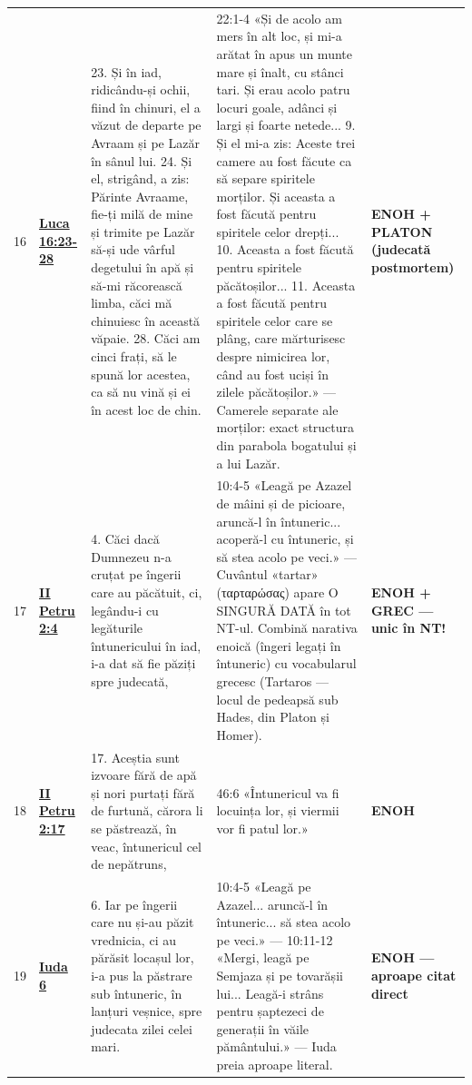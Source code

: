\documentclass[12pt,a4paper,twoside,openany]{book}
\begin{document}
\begin{longtable}{L{0.7cm}L{0.7cm}L{5.2cm}L{7.1cm}L{0.7cm}}
16 & \href{https://bibliaortodoxa.ro/carte.php?id=48\&cap=16\#23}{\textbf{Luca 16:23-28}} & 23. Și în iad, ridicându-și ochii, fiind în chinuri, el a văzut de departe pe Avraam și pe Lazăr în sânul lui. 24. Și el, strigând, a zis: Părinte Avraame, fie-ți milă de mine și trimite pe Lazăr să-și ude vârful degetului în apă și să-mi răcorească limba, căci mă chinuiesc în această văpaie. 28. Căci am cinci frați, să le spună lor acestea, ca să nu vină și ei în acest loc de chin. & 22:1-4 «Și de acolo am mers în alt loc, și mi-a arătat în apus un munte mare și înalt, cu stânci tari. Și erau acolo patru locuri goale, adânci și largi și foarte netede... 9. Și el mi-a zis: Aceste trei camere au fost făcute ca să separe spiritele morților. Și aceasta a fost făcută pentru spiritele celor drepți... 10. Aceasta a fost făcută pentru spiritele păcătoșilor... 11. Aceasta a fost făcută pentru spiritele celor care se plâng, care mărturisesc despre nimicirea lor, când au fost uciși în zilele păcătoșilor.» — Camerele separate ale morților: exact structura din parabola bogatului și a lui Lazăr. & \textbf{ENOH + PLATON (judecată postmortem)} \\
17 & \href{https://bibliaortodoxa.ro/carte.php?id=62\&cap=2\#4}{\textbf{II Petru 2:4}} & 4. Căci dacă Dumnezeu n-a cruțat pe îngerii care au păcătuit, ci, legându-i cu legăturile întunericului în iad, i-a dat să fie păziți spre judecată, & 10:4-5 «Leagă pe Azazel de mâini și de picioare, aruncă-l în întuneric... acoperă-l cu întuneric, și să stea acolo pe veci.» — Cuvântul «tartar» (ταρταρώσας) apare O SINGURĂ DATĂ în tot NT-ul. Combină narativa enoică (îngeri legați în întuneric) cu vocabularul grecesc (Tartaros — locul de pedeapsă sub Hades, din Platon și Homer). & \textbf{ENOH + GREC — unic în NT!} \\
18 & \href{https://bibliaortodoxa.ro/carte.php?id=62\&cap=2\#17}{\textbf{II Petru 2:17}} & 17. Aceștia sunt izvoare fără de apă și nori purtați fără de furtună, cărora li se păstrează, în veac, întunericul cel de nepătruns, & 46:6 «Întunericul va fi locuința lor, și viermii vor fi patul lor.» & \textbf{ENOH} \\
19 & \href{https://bibliaortodoxa.ro/carte.php?id=44\&cap=1\#6}{\textbf{Iuda 6}} & 6. Iar pe îngerii care nu și-au păzit vrednicia, ci au părăsit locașul lor, i-a pus la păstrare sub întuneric, în lanțuri veșnice, spre judecata zilei celei mari. & 10:4-5 «Leagă pe Azazel... aruncă-l în întuneric... să stea acolo pe veci.» — 10:11-12 «Mergi, leagă pe Semjaza și pe tovarășii lui... Leagă-i strâns pentru șaptezeci de generații în văile pământului.» — Iuda preia aproape literal. & \textbf{ENOH — aproape citat direct} \\

\end{longtable}
\end{document}

